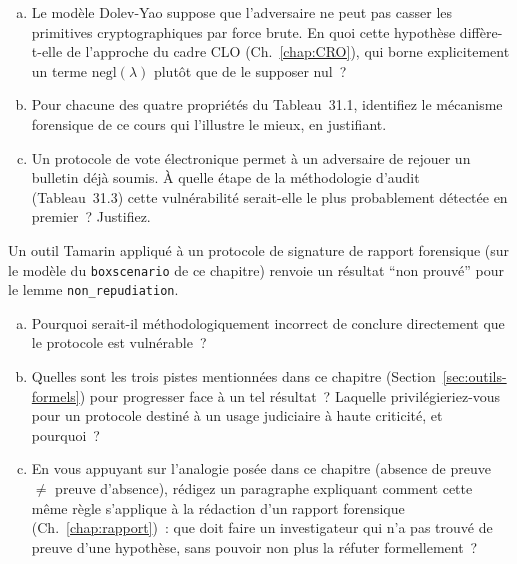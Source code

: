 \bigskip

\begin{boxexo}[title={\ding{45}\quad Exercice~31.1. Maîtrise du modèle Dolev-Yao \niveaubase}]
\begin{enumerate}[(a)]
    \item Le modèle Dolev-Yao suppose que l'adversaire ne peut pas
          casser les primitives cryptographiques par force brute.
          En quoi cette hypothèse diffère-t-elle de l'approche du
          cadre CLO (Ch.~\ref{chap:CRO}), qui borne explicitement
          un terme $\mathrm{negl}(\lambda)$ plutôt que de le
          supposer nul~?
    \item Pour chacune des quatre propriétés du Tableau~31.1,
          identifiez le mécanisme forensique de ce cours qui
          l'illustre le mieux, en justifiant.
    \item Un protocole de vote électronique permet à un adversaire
          de rejouer un bulletin déjà soumis. À quelle étape de la
          méthodologie d'audit (Tableau~31.3) cette vulnérabilité
          serait-elle le plus probablement détectée en premier~?
          Justifiez.
\end{enumerate}
\end{boxexo}

\begin{boxexo}[title={\ding{45}\quad Exercice~31.2. Interprétation d'un résultat de vérification \niveaumoyen}]
Un outil Tamarin appliqué à un protocole de signature de rapport
forensique (sur le modèle du \texttt{boxscenario} de ce chapitre)
renvoie un résultat ``non prouvé'' pour le lemme
\texttt{non\_repudiation}.
\begin{enumerate}[(a)]
    \item Pourquoi serait-il méthodologiquement incorrect de
          conclure directement que le protocole est vulnérable~?
    \item Quelles sont les trois pistes mentionnées dans ce
          chapitre (Section~\ref{sec:outils-formels}) pour
          progresser face à un tel résultat~? Laquelle
          privilégieriez-vous pour un protocole destiné à un usage
          judiciaire à haute criticité, et pourquoi~?
    \item En vous appuyant sur l'analogie posée dans ce chapitre
          (absence de preuve $\neq$ preuve d'absence), rédigez un
          paragraphe expliquant comment cette même règle
          s'applique à la rédaction d'un rapport forensique
          (Ch.~\ref{chap:rapport})~: que doit faire un investigateur
          qui n'a pas trouvé de preuve d'une hypothèse, sans pouvoir
          non plus la réfuter formellement~?
\end{enumerate}
\end{boxexo}

